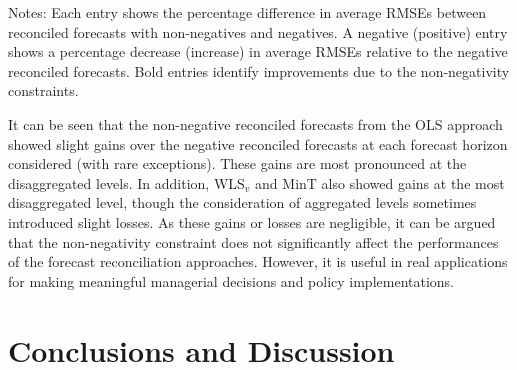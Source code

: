 \documentclass[11pt]{article}
\newcommand{\0}{\phantom{0}}
\begin{document}
\begin{table}[p]
\begin{threeparttable}
\begin{tabular}{lrrrrrrrrrrr}
			\bottomrule
		\end{tabular}
		\begin{tablenotes}
			\item [] Notes: Each entry shows the percentage difference in average RMSEs between reconciled forecasts with non-negatives and negatives. A negative (positive) entry shows a percentage decrease (increase) in average RMSEs relative to the negative reconciled forecasts. Bold entries identify improvements due to the non-negativity constraints. 
		\end{tablenotes}
	\end{threeparttable}
\end{table}	

It can be seen that the non-negative reconciled forecasts from the OLS approach showed slight gains over the negative reconciled forecasts at each forecast horizon considered (with rare exceptions). These gains are most pronounced at the disaggregated levels. In addition, WLS$_{v}$ and MinT also showed gains at the most disaggregated level, though the consideration of aggregated levels sometimes introduced slight losses. As these gains or losses are negligible, it can be argued that the non-negativity constraint does not significantly affect the performances of the forecast reconciliation approaches. However, it is useful in real applications for making meaningful managerial decisions and policy implementations. 

\clearpage

\section{Conclusions and Discussion}
\end{document}
